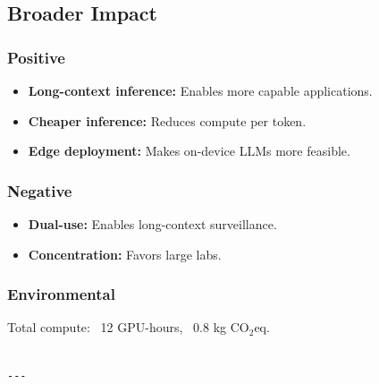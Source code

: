 \subsection{Broader Impact}

\subsubsection{Positive}
\begin{itemize}
\item \textbf{Long-context inference:} Enables more capable applications.
\item \textbf{Cheaper inference:} Reduces compute per token.
\item \textbf{Edge deployment:} Makes on-device LLMs more feasible.

\end{itemize}
\subsubsection{Negative}
\begin{itemize}
\item \textbf{Dual-use:} Enables long-context surveillance.
\item \textbf{Concentration:} Favors large labs.

\end{itemize}
\subsubsection{Environmental}
Total compute: ~12 GPU-hours, ~0.8 kg CO$_2$eq.
\begin{lstlisting}

---
\end{lstlisting}